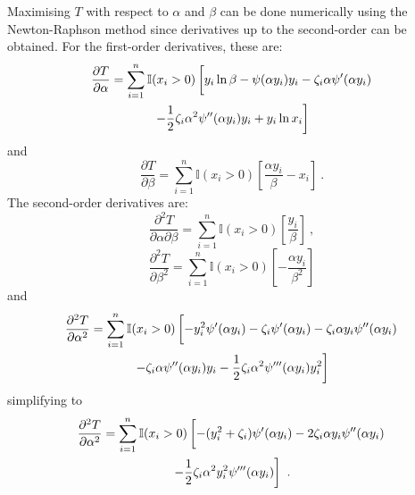 Maximising $T$ with respect to $\alpha$ and $\beta$ can be done numerically using the Newton-Raphson method since derivatives up to the second-order can be obtained. For the first-order derivatives, these are:
\begin{multline}
  \frac{\partial T}{\partial \alpha} =
  \sum_{i=1}^n\mathbb{I}(x_i>0)
  \left[
    y_i\ln\beta -\psi(\alpha y_i)y_i-\zeta_i\alpha\psi'(\alpha y_i)
    \vphantom{\frac{1}{1}}
  \right.
  \\
  \left.
    - \frac{1}{2}\zeta_i\alpha^2\psi''(\alpha y_i)y_i + y_i\ln x_i
  \right]
\end{multline}
and
\begin{equation}
  \frac{\partial T}{\partial \beta} = \sum_{i=1}^n\mathbb{I}(x_i>0)\left[
  \frac{\alpha y_i}{\beta}-x_i
  \right]
  \ .
\end{equation}
The second-order derivatives are:
\begin{equation}
  \frac{\partial^2 T}{\partial \alpha \partial \beta} =
  \sum_{i=1}^n \mathbb{I}(x_i>0)\left[\frac{y_i}{\beta}\right]
  \ ,
  \label{eq:compoundPoisson:d2tdadb}
\end{equation}
\begin{equation}
  \frac{\partial^2 T}{\partial \beta^2} = \sum_{i=1}^n\mathbb{I}(x_i>0)\left[-\frac{\alpha y_i}{\beta^2}
  \right]
  \label{eq:compoundPoisson:d2td2b}
\end{equation}
and
\begin{multline*}
  \frac{\partial^2 T}{\partial \alpha^2} = 
  \sum_{i=1}^n\mathbb{I}(x_i>0)
  \left[
    -y_i^2\psi'(\alpha y_i) - \zeta_i\psi'(\alpha y_i) - \zeta_i\alpha y_i\psi''(\alpha y_i)
    \vphantom{\frac{1}{2}}\right.\\\left. 
    - \zeta_i\alpha\psi''(\alpha y_i)y_i
    -\frac{1}{2}\zeta_i\alpha^2\psi'''(\alpha y_i)y_i^2
  \right]
\end{multline*}
simplifying to
\begin{multline}
  \frac{\partial^2 T}{\partial \alpha^2} = 
  \sum_{i=1}^n\mathbb{I}(x_i>0)
  \left[
    -(y_i^2+\zeta_i)\psi'(\alpha y_i) - 2\zeta_i\alpha y_i\psi''(\alpha y_i)
    \vphantom{\frac{1}{2}}
  \right.
  \\
  \left.  
    -\frac{1}{2}\zeta_i\alpha^2y_i^2\psi'''(\alpha y_i)
  \right] \ .
  \label{eq:compoundPoisson:d2td2a}
\end{multline}

